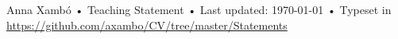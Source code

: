 \documentclass[10pt, a4paper]{article}
\begin{document}
\vfill{}

\begin{center}
{\scriptsize  Anna Xambó •\- Teaching Statement •\- Last updated: \today\- •\- %
Typeset in \href{http://nitens.org/taraborelli/cvtex}{
\XeTeX }\\
\href{https://github.com/axambo/CV/tree/master/Statements}{https://github.com/axambo/CV/tree/master/Statements}}
\end{center}
\end{document}
